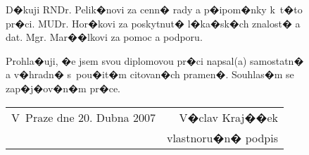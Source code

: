 %
%

\vspace*{1em}





\begin{figure}[t]

\par
D�kuji RNDr. Pelik�novi za cenn� rady a p�ipom�nky k~t�to pr�ci. MUDr. Hor�kovi za poskytnut� l�ka�sk�ch znalost� a dat. Mgr. Mar��lkovi za pomoc a podporu.

\end{figure}






\vspace*{1em}

\flushbottom

\begin{figure}[b]

\par
Prohla�uji, �e jsem svou diplomovou pr�ci napsal(a) samostatn� a v�hradn� s~pou�it�m citovan�ch pramen�. Souhlas�m se zap�j�ov�n�m pr�ce.

\vspace{2em}

\begin{tabular*}{1.0\textwidth}[b]{@{\extracolsep{\fill}} l r }
V~Praze dne 20. Dubna 2007 & V�clav Kraj��ek\\
                           & vlastnoru�n� podpis
\end{tabular*}

\vspace*{2em}

\end{figure}

\raggedbottom

 
